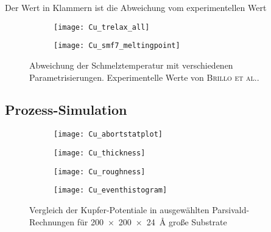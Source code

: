 \begin{table}
\begin{threeparttable}
    \begin{tablenotes}
      \item[a] Der Wert in Klammern ist die Abweichung vom experimentellen Wert
    \end{tablenotes}
  \end{threeparttable}
\end{table}

\begin{figure}
  \captionsetup[subfigure]{singlelinecheck=false}
  \def\subfigwidth{7cm}
  \begin{subfigure}[t]{\subfigwidth}
    \texttt{[image: Cu\_trelax\_all]}
  \end{subfigure}
  \hfill
  \begin{subfigure}[t]{\subfigwidth}
    \texttt{[image: Cu\_smf7\_meltingpoint]}
  \end{subfigure}
  \caption[Abweichung der Schmelztemperaturen bei Kupfer-MD]{
    Abweichung der Schmelztemperatur mit verschiedenen Parametrisierungen.
    Experimentelle Werte von \textsc{Brillo et al.}\cite{brillo_density_2006}.
  }
  \label{fig:copperthermo}
\end{figure}

\subsection{Prozess-Simulation}
\label{coppersimulation}

\begin{figure}
  \captionsetup[subfigure]{singlelinecheck=false}
  \def\subfigwidth{0.49\textwidth}
  \begin{subfigure}[t]{\subfigwidth}
    \texttt{[image: Cu\_abortstatplot]}
    \label{fig:copperparsivald-a}
  \end{subfigure}
  \hfill
  \begin{subfigure}[t]{\subfigwidth}
    \texttt{[image: Cu\_thickness]}
    \label{fig:copperparsivald-b}
  \end{subfigure}
  \begin{subfigure}[t]{\subfigwidth}
    \texttt{[image: Cu\_roughness]}
    \label{fig:copperparsivald-c}
  \end{subfigure}
  \hfill
  \begin{subfigure}[t]{\subfigwidth}
    \texttt{[image: Cu\_eventhistogram]}
    \label{fig:copperparsivald-d}
  \end{subfigure}
  \caption{Vergleich der Kupfer-Potentiale in ausgewählten Parsivald-Rechnungen für \SI{200x200x24}{\angstrom} große Substrate}
  \label{fig:copperparsivald}
\end{figure}

